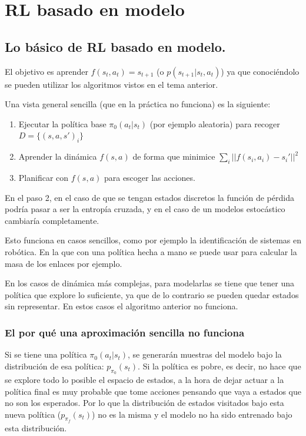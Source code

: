 \chapter{RL basado en modelo}


\section{Lo básico de RL basado en modelo.}%
\label{sec:lo_básico_de_rl_basado_en_modelo_}

El objetivo es aprender $f(s_t,a_t)=s_{t+1}$ (o $p(s_{t+1}|s_t,a_t)$) ya que conociéndolo se pueden utilizar los
algoritmos vistos en el tema anterior.

Una vista general sencilla (que en la práctica no funciona) es la siguiente:
\begin{enumerate}
    \item Ejecutar la política base $\pi_0(a_t|s_t)$ (por ejemplo aleatoria) para recoger
        $D=\{(s,a,s')_i\}$
    \item Aprender la dinámica $f(s,a)$ de forma que minimice  $\sum_i
        ||f(s_i,a_i)-s_i'||^2$
    \item Planificar con $f(s,a)$ para escoger las acciones.
\end{enumerate}

En el paso 2, en el caso de que se tengan estados discretos la función de pérdida podría pasar
a ser la entropía cruzada, y en el caso de un modelos estocástico cambiaría completamente.

Esto funciona en casos sencillos, como por ejemplo la identificación de sistemas en
robótica. En la que con una política hecha a mano se puede usar para calcular la masa de
los enlaces por ejemplo.

En los casos de dinámica más complejas, para modelarlas se tiene que tener una política que
explore lo suficiente, ya que de lo contrario se pueden quedar estados sin representar. En
estos casos el algoritmo anterior no funciona.

\subsection{El por qué una aproximación sencilla no funciona}%
\label{sub:el_por_qué_una_aproximación_sencilla_no_funciona}

Si se tiene una política $\pi_0(a_t|s_t)$, se generarán muestras del modelo bajo la distribución
de esa política: $p_{\pi_0}(s_t)$. Si la política es pobre, es decir, no hace que se explore
todo lo posible el espacio de estados, a la hora de dejar actuar a la política final es muy
probable que tome acciones pensando que vaya a estados que no son los esperados. Por lo que la
distribución de estados visitados bajo esta nueva política ($p_{\pi_f}(s_t)$) no es la misma y el modelo no ha
sido entrenado bajo esta distribución.


